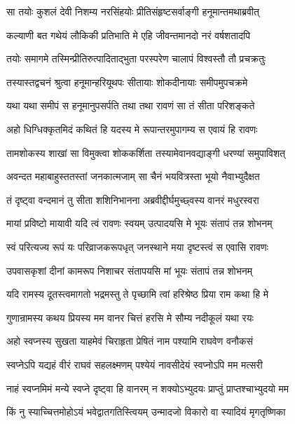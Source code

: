 \twolineshloka
{सा तयोः कुशलं देवी निशम्य नरसिंहयोः}
{प्रीतिसंहृष्टसर्वाङ्गी हनूमान्तमथाब्रवीत्} %

\twolineshloka
{कल्याणी बत गथेयं लौकिकी प्रतिभाति मे}
{एहि जीवन्तमानदो नरं वर्षशतादपि} %

\twolineshloka
{तयोः समागमे तस्मिन्प्रीतिरुत्पादिताद्भुता}
{परस्परेण चालापं विश्वस्तौ तौ प्रचक्रतुः} %

\twolineshloka
{तस्यास्तद्वचनं श्रुत्वा हनूमान्हरियूथपः}
{सीतायाः शोकदीनायाः समीपमुपचक्रमे} %

\twolineshloka
{यथा यथा समीपं स हनूमानुपसर्पति}
{तथा तथा रावणं सा तं सीता परिशङ्कते} %

\twolineshloka
{अहो धिग्धिक्कृतमिदं कथितं हि यदस्य मे}
{रूपान्तरमुपागम्य स एवायं हि रावणः} %

\twolineshloka
{तामशोकस्य शाखां सा विमुक्त्वा शोककर्शिता}
{तस्यामेवानवद्याङ्गी धरण्यां समुपाविशत्} %

\twolineshloka
{अवन्दत महाबाहुस्ततस्तां जनकात्मजाम्}
{सा चैनं भयवित्रस्ता भूयो नैवाभ्युदैक्षत} %

\twolineshloka
{तं दृष्ट्वा वन्दमानं तु सीता शशिनिभानना}
{अब्रवीद्दीर्घमुच्छ्वस्य वानरं मधुरस्वरा} %

\twolineshloka
{मायां प्रविष्टो मायावी यदि त्वं रावणः स्वयम्}
{उत्पादयसि मे भूयः संतापं तन्न शोभनम्} %

\twolineshloka
{स्वं परित्यज्य रूपं यः परिव्राजकरूपधृत्}
{जनस्थाने मया दृष्टस्त्वं स एवासि रावणः} %

\twolineshloka
{उपवासकृशां दीनां कामरूप निशाचर}
{संतापयसि मां भूयः संतापं तन्न शोभनम्} %

\twolineshloka
{यदि रामस्य दूतस्त्वमागतो भद्रमस्तु ते}
{पृच्छामि त्वां हरिश्रेष्ठ प्रिया राम कथा हि मे} %

\twolineshloka
{गुणान्रामस्य कथय प्रियस्य मम वानर}
{चित्तं हरसि मे सौम्य नदीकूलं यथा रयः} %

\twolineshloka
{अहो स्वप्नस्य सुखता याहमेवं चिराहृता}
{प्रेषितं नाम पश्यामि राघवेण वनौकसं} %

\twolineshloka
{स्वप्नेऽपि यद्यहं वीरं राघवं सहलक्ष्मणम्}
{पश्येयं नावसीदेयं स्वप्नोऽपि मम मत्सरी} %

\twolineshloka
{नाहं स्वप्नमिमं मन्ये स्वप्ने दृष्ट्वा हि वानरम्}
{न शक्योऽभ्युदयः प्राप्तुं प्राप्तश्चाभ्युदयो मम} %

\twolineshloka
{किं नु स्याच्चित्तमोहोऽयं भवेद्वातगतिस्त्वियम्}
{उन्मादजो विकारो वा स्यादियं मृगतृष्णिका} %

